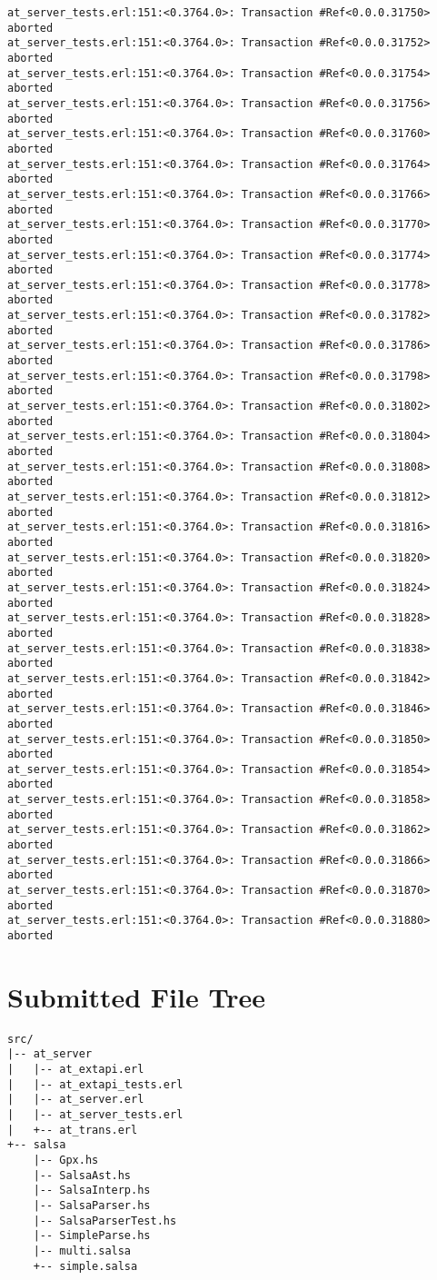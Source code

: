 \documentclass[
paper=a4,
oneside,
fontsize=11pt,
numbers=noenddot,
headinclude=false, %
footinclude=false, %
fleqn,             %
DIV=8
]{scrartcl}
\begin{document}
\begin{lstlisting}[caption=Session output: {\tt
    commit\_t\_competing\_test()} (debug enabled),
  label=lst:testoutextapi, basicstyle=\ttfamily\scriptsize]
at_server_tests.erl:151:<0.3764.0>: Transaction #Ref<0.0.0.31750> aborted
at_server_tests.erl:151:<0.3764.0>: Transaction #Ref<0.0.0.31752> aborted
at_server_tests.erl:151:<0.3764.0>: Transaction #Ref<0.0.0.31754> aborted
at_server_tests.erl:151:<0.3764.0>: Transaction #Ref<0.0.0.31756> aborted
at_server_tests.erl:151:<0.3764.0>: Transaction #Ref<0.0.0.31760> aborted
at_server_tests.erl:151:<0.3764.0>: Transaction #Ref<0.0.0.31764> aborted
at_server_tests.erl:151:<0.3764.0>: Transaction #Ref<0.0.0.31766> aborted
at_server_tests.erl:151:<0.3764.0>: Transaction #Ref<0.0.0.31770> aborted
at_server_tests.erl:151:<0.3764.0>: Transaction #Ref<0.0.0.31774> aborted
at_server_tests.erl:151:<0.3764.0>: Transaction #Ref<0.0.0.31778> aborted
at_server_tests.erl:151:<0.3764.0>: Transaction #Ref<0.0.0.31782> aborted
at_server_tests.erl:151:<0.3764.0>: Transaction #Ref<0.0.0.31786> aborted
at_server_tests.erl:151:<0.3764.0>: Transaction #Ref<0.0.0.31798> aborted
at_server_tests.erl:151:<0.3764.0>: Transaction #Ref<0.0.0.31802> aborted
at_server_tests.erl:151:<0.3764.0>: Transaction #Ref<0.0.0.31804> aborted
at_server_tests.erl:151:<0.3764.0>: Transaction #Ref<0.0.0.31808> aborted
at_server_tests.erl:151:<0.3764.0>: Transaction #Ref<0.0.0.31812> aborted
at_server_tests.erl:151:<0.3764.0>: Transaction #Ref<0.0.0.31816> aborted
at_server_tests.erl:151:<0.3764.0>: Transaction #Ref<0.0.0.31820> aborted
at_server_tests.erl:151:<0.3764.0>: Transaction #Ref<0.0.0.31824> aborted
at_server_tests.erl:151:<0.3764.0>: Transaction #Ref<0.0.0.31828> aborted
at_server_tests.erl:151:<0.3764.0>: Transaction #Ref<0.0.0.31838> aborted
at_server_tests.erl:151:<0.3764.0>: Transaction #Ref<0.0.0.31842> aborted
at_server_tests.erl:151:<0.3764.0>: Transaction #Ref<0.0.0.31846> aborted
at_server_tests.erl:151:<0.3764.0>: Transaction #Ref<0.0.0.31850> aborted
at_server_tests.erl:151:<0.3764.0>: Transaction #Ref<0.0.0.31854> aborted
at_server_tests.erl:151:<0.3764.0>: Transaction #Ref<0.0.0.31858> aborted
at_server_tests.erl:151:<0.3764.0>: Transaction #Ref<0.0.0.31862> aborted
at_server_tests.erl:151:<0.3764.0>: Transaction #Ref<0.0.0.31866> aborted
at_server_tests.erl:151:<0.3764.0>: Transaction #Ref<0.0.0.31870> aborted
at_server_tests.erl:151:<0.3764.0>: Transaction #Ref<0.0.0.31880> aborted
\end{lstlisting}

\clearpage
\section{Submitted File Tree}
\label{sec:submitted-files}

\begin{lstlisting}[caption=File tree under {\tt src/}, label=lst:filetree]
src/
|-- at_server
|   |-- at_extapi.erl
|   |-- at_extapi_tests.erl
|   |-- at_server.erl
|   |-- at_server_tests.erl
|   +-- at_trans.erl
+-- salsa
    |-- Gpx.hs
    |-- SalsaAst.hs
    |-- SalsaInterp.hs
    |-- SalsaParser.hs
    |-- SalsaParserTest.hs
    |-- SimpleParse.hs
    |-- multi.salsa
    +-- simple.salsa
\end{lstlisting}
\end{document}
